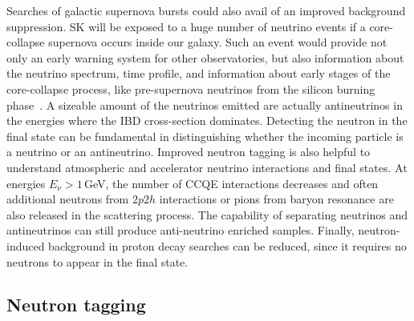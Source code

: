 Searches of galactic supernova bursts could also avail of an improved background suppression.
SK will be exposed to a huge number of neutrino events if a core-collapse supernova occurs inside our galaxy.
Such an event would provide not only an early warning system for other observatories, %
but also information about the neutrino spectrum, time profile, and information about early stages of the core-collapse process, %
like pre-supernova neutrinos from the silicon burning phase~\cite{Simpson:2019xwo}.
A sizeable amount of the neutrinos emitted are actually antineutrinos in the energies where the IBD cross-section dominates.
Detecting the neutron in the final state can be fundamental in distinguishing whether the incoming particle is %
a neutrino or an antineutrino.
Improved neutron tagging is also helpful to understand atmospheric and accelerator neutrino interactions and final states.
At energies $E_\nu > 1$\,GeV, the number of CCQE interactions decreases and often additional neutrons %
from $2p2h$ interactions or pions from baryon resonance are also released in the scattering process.
The capability of separating neutrinos and antineutrinos can still produce anti-neutrino enriched samples.
Finally, neutron-induced background in proton decay searches can be reduced, since it requires no neutrons to appear in the final state.


\subsection{Neutron tagging}

